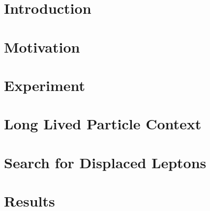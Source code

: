 \documentclass{ucetd}
\begin{document}
\part{Introduction}


\cleardoublepage

\part{Motivation}



\cleardoublepage 

\part{Experiment}






\cleardoublepage 

\part{Long Lived Particle Context}



\cleardoublepage
\part{Search for Displaced Leptons}




\cleardoublepage
\part{Results}





\cleardoublepage 

\printbibliography[heading=bibintoc,title={References}]

%
%
\end{document}
